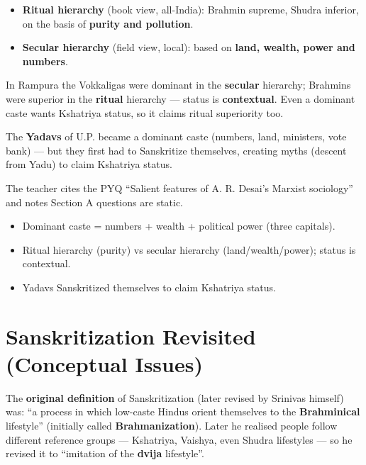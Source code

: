 \begin{ComparisonBox}
\begin{itemize}
\item \textbf{Ritual hierarchy} (book view, all-India): Brahmin supreme, Shudra inferior, on the basis of \textbf{purity and pollution}.
\item \textbf{Secular hierarchy} (field view, local): based on \textbf{land, wealth, power and numbers}.
\end{itemize}
\end{ComparisonBox}

In Rampura the Vokkaligas were dominant in the \textbf{secular} hierarchy; Brahmins were superior in the \textbf{ritual} hierarchy --- status is \textbf{contextual}. Even a dominant caste wants Kshatriya status, so it claims ritual superiority too.

\begin{ExampleBox}
The \textbf{Yadavs} of U.P. became a dominant caste (numbers, land, ministers, vote bank) --- but they first had to Sanskritize themselves, creating myths (descent from Yadu) to claim Kshatriya status.
\end{ExampleBox}

\begin{PYQLink}
The teacher cites the PYQ ``Salient features of A. R. Desai's Marxist sociology'' and notes Section A questions are static.
\end{PYQLink}

\begin{QuickRevision}
\begin{itemize}
\item Dominant caste = numbers + wealth + political power (three capitals).
\item Ritual hierarchy (purity) vs secular hierarchy (land/wealth/power); status is contextual.
\item Yadavs Sanskritized themselves to claim Kshatriya status.
\end{itemize}
\end{QuickRevision}

\section{Sanskritization Revisited (Conceptual Issues)}

The \textbf{original definition} of Sanskritization (later revised by Srinivas himself) was: ``a process in which low-caste Hindus orient themselves to the \textbf{Brahminical} lifestyle'' (initially called \textbf{Brahmanization}). Later he realised people follow different reference groups --- Kshatriya, Vaishya, even Shudra lifestyles --- so he revised it to ``imitation of the \textbf{dvija} lifestyle''.

